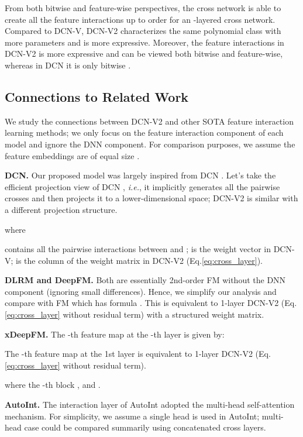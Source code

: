\documentclass[sigconf]{acmart}
\begin{document}
From both bitwise and feature-wise perspectives, the cross network is able to create all the feature interactions up to order  for an -layered cross network. Compared to DCN-V, {DCN-V2} characterizes the same polynomial class with more parameters and is more expressive. Moreover, the feature interactions in {DCN-V2} is more expressive and can be viewed both bitwise and feature-wise, whereas in DCN it is only bitwise \cite{wang2017deep, lian2018xdeepfm, song2019autoint}.

\subsection{Connections to Related Work}
We study the connections between {DCN-V2} and other SOTA feature interaction learning methods; we only focus on the feature interaction component of each model and ignore the DNN component. For comparison purposes, we assume the feature embeddings are of equal size .

{\bf DCN.} Our proposed model was largely inspired from DCN \cite{wang2017deep}. Let's take the efficient projection view of DCN \cite{wang2017deep}, \emph{i.e.}, it implicitly generates all the pairwise crosses and then projects it to a lower-dimensional space; {DCN-V2} is similar with a different projection structure.
    
where

contains all the  pairwise interactions between  and ;  is the weight vector in DCN-V;  is the  column of the weight matrix in {DCN-V2} (Eq.\eqref{eq:cross_layer}).

{\bf DLRM and DeepFM.} Both are essentially 2nd-order FM without the DNN component (ignoring small differences). Hence, we simplify our analysis and compare with FM which has formula
.
This is equivalent to 1-layer {DCN-V2} (Eq. \eqref{eq:cross_layer} without residual term) with a structured weight matrix.



{\bf xDeepFM.} The -th feature map at the -th layer is given by:

The -th feature map at the 1st layer is equivalent to 1-layer {DCN-V2} (Eq. \eqref{eq:cross_layer} without residual term).

where the -th block , and . 

{\bf AutoInt.} The interaction layer of AutoInt adopted the multi-head self-attention mechanism. For simplicity, we assume a single head is used in AutoInt; multi-head case could be compared summarily using concatenated cross layers.  
\end{document}
